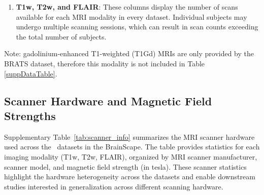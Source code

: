 \begin{enumerate}
    \item \textbf{T1w, T2w, and FLAIR}: These columns display the number of scans available for each MRI modality in every dataset. 
    Individual subjects may undergo multiple scanning sessions, which can result in scan counts exceeding the total number of subjects. 
\end{enumerate}

Note: gadolinium-enhanced T1-weighted (T1Gd) MRIs are only provided by the BRATS dataset, therefore this modality is not included in Table \ref{suppDataTable}.



\subsection{Scanner Hardware and Magnetic Field Strengths}

Supplementary Table~\ref{tab:scanner_info} summarizes the MRI scanner hardware
used across the \NumDatasets\ datasets in the BrainScape. 
The table provides statistics for each imaging modality (T1w, T2w, FLAIR), organized by MRI scanner manufacturer, 
scanner model, and magnetic field strength (in tesla). 
These scanner statistics highlight the hardware heterogeneity across the datasets 
and enable downstream studies interested in generalization across different scanning hardware.

